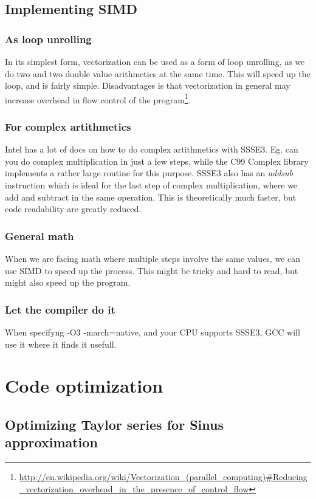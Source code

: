 \documentclass[english,a4paper,numbers=noenddot]{scrartcl}
\renewcommand{\thesection}{Task \arabic{section}}
\renewcommand{\thesubsection}{\alph{subsection})}
\renewcommand{\thesubsubsection}{\alph{subsection}) \arabic{subsubsection}.}
\begin{document}
\renewcommand{\thesubsubsection}{\arabic{subsubsection}.}
\subsection{Implementing SIMD}
\subsubsection{As loop unrolling}
In its simplest form, vectorization can be used as a form of loop unrolling, as we do two and two double value arithmetics at the same time. This will speed up the loop, and is fairly simple. Disadvantages is that
vectorization in general may increase overhead in flow control of the program\footnote{\url{http://en.wikipedia.org/wiki/Vectorization_(parallel_computing)#Reducing_vectorization_overhead_in_the_presence_of_control_flow}}.
\subsubsection{For complex artithmetics}
Intel has a lot of docs on how to do complex artithmetics with SSSE3. Eg. can you do complex multiplication in just a few steps, while the C99 Complex library implements a rather large routine for this purpose.
SSSE3 also has an \emph{addsub} instruction which is ideal for the last step of complex multiplication, where we add and subtract in the same operation. This is theoretically much faster, but code readability are greatly reduced.
\subsubsection{General math}
When we are facing math where multiple steps involve the same values, we can use SIMD to speed up the process. This might be tricky and hard to read, but might also speed up the program.
\subsubsection{Let the compiler do it}
When specifyng -O3 -march=native, and your CPU supports SSSE3, GCC will use it where it finds it usefull.

\renewcommand{\thesection}{Task \arabic{section}}
\renewcommand{\thesubsection}{Task \arabic{section}.\arabic{subsection}}

\section{Code optimization}
\subsection{Optimizing Taylor series for Sinus approximation}
\end{document}
